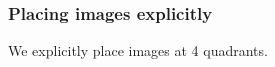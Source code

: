 \documentclass{article}
\begin{document}


\subsubsection{Placing images explicitly}
We explicitly place images at 4 quadrants. 
\end{document}
